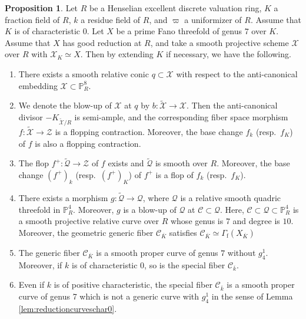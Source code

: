 \documentclass[autodetect-engine, a4paper]{amsart}
\theoremstyle{definition}
\newtheorem{prop}[thm]{Proposition}
\def\P{{\mathbb P}}
\begin{document}
\begin{prop}
\label{prop:mixedtwo-ray}
Let $R$ be a Henselian excellent discrete valuation ring, $K$ a fraction field of $R$, $k$ a residue field of $R$, and $\varpi$ a uniformizer of $R$. Assume that $K$ is of characteristic $0$.
Let $X$ be a prime Fano threefold of genus $7$ over $K$.
Assume that $X$ has good reduction at $R$, and take a smooth projective scheme $\mathcal{X}$ over $R$ with $\mathcal{X}_{K} \simeq X$.
Then by extending $K$ if necessary, we have the following.
\begin{enumerate}
\item
There exists a smooth relative conic $q \subset \mathcal{X}$ with respect to the anti-canonical embedding $\mathcal{X} \subset \P^8_{R}$.
\item
We denote the blow-up of $\mathcal{X}$ at $q$ by $b \colon \widetilde{\mathcal{X}} \rightarrow \mathcal{X}$.
Then the anti-canonical divisor $-K_{\widetilde{\mathcal{X}}/R}$ is semi-ample, and the corresponding fiber space morphism $f \colon \widetilde{\mathcal{X}} \rightarrow \mathcal{Z}$ is a flopping contraction.
Moreover, the base change $f_{k}$ (resp.\ $f_{K}$) of $f$ is also a flopping contraction.
\item
The flop $f^+ \colon \widetilde{\mathcal{Q}} \rightarrow \mathcal{Z}$ of $f$ exists and $\widetilde{\mathcal{Q}}$ is smooth over $R$.
Moreover, the base change $(f^+)_{k}$ (resp.\ $(f^+)_{K}$) of $f^{+}$ is a flop of $f_{k}$ (resp.\ $f_{K}$). 
\item
There exists a morphism $g \colon \widetilde{\mathcal{Q}} \rightarrow \mathcal{Q}$, where $\mathcal{Q}$ is a relative smooth quadric threefold in $\P^{4}_{R}$.
Moreover, $g$ is a blow-up of $\mathcal{Q}$ at $\mathcal{C} \subset \mathcal{Q}$.
Here, $\mathcal{C} \subset \mathcal{Q} \subset \P^{4}_{R}$ is a smooth projective relative curve over $R$ whose genus is $7$ and degree is $10$.
Moreover,
the geometric generic fiber $\mathcal{C}_{\overline{K}}$ satisfies 
$
\mathcal{C}_{\overline{K}} \simeq \Gamma_{\mathrm{f}}(X_{\overline{K}})
$
\item 
The generic fiber $\mathcal{C}_{\overline{K}}$ is a smooth proper curve of genus $7$ without $g_4^1$.
Moreover, if $k$ is of characteristic 0, so is the special fiber $\mathcal{C}_{\overline{k}}$.
\item
Even if $k$ is of positive characteristic,
the special fiber $\mathcal{C}_{\overline{k}}$ is a smooth proper curve of genus 7 which is not a generic curve with $g_4^1$ in the sense of Lemma \ref{lem:reductioncurveschar0}.
\end{enumerate}
\end{prop}
\end{document}
